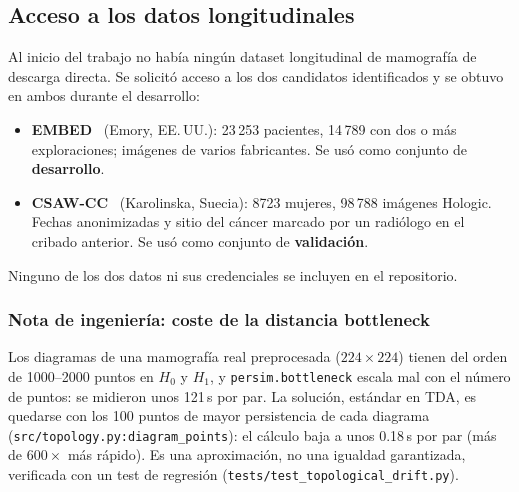\subsection{Acceso a los datos longitudinales}
\label{subsec:acceso-longitudinal}
Al inicio del trabajo no había ningún dataset longitudinal de mamografía de
descarga directa. Se solicitó acceso a los dos candidatos identificados y se
obtuvo en ambos durante el desarrollo:
\begin{itemize}
  \item \textbf{EMBED}~\cite{jeong2021embed} (Emory, EE.\,UU.): 23\,253
        pacientes, 14\,789 con dos o más exploraciones; imágenes de varios
        fabricantes. Se usó como conjunto de \textbf{desarrollo}.
  \item \textbf{CSAW-CC}~\cite{dataset_csawcc} (Karolinska, Suecia): 8723
        mujeres, 98\,788 imágenes Hologic. Fechas anonimizadas y sitio del
        cáncer marcado por un radiólogo en el cribado anterior. Se usó como
        conjunto de \textbf{validación}.
\end{itemize}
Ninguno de los dos datos ni sus credenciales se incluyen en el repositorio.

\subsubsection*{Nota de ingeniería: coste de la distancia bottleneck}
Los diagramas de una mamografía real preprocesada ($224\times224$) tienen del
orden de 1000--2000 puntos en $H_0$ y $H_1$, y \texttt{persim.bottleneck}
escala mal con el número de puntos: se midieron unos 121\,s por par. La
solución, estándar en TDA, es quedarse con los 100 puntos de mayor
persistencia de cada diagrama (\texttt{src/topology.py:diagram\_points}):
el cálculo baja a unos 0.18\,s por par (más de $600\times$ más rápido). Es
una aproximación, no una igualdad garantizada, verificada con un test de
regresión (\texttt{tests/test\_topological\_drift.py}).

